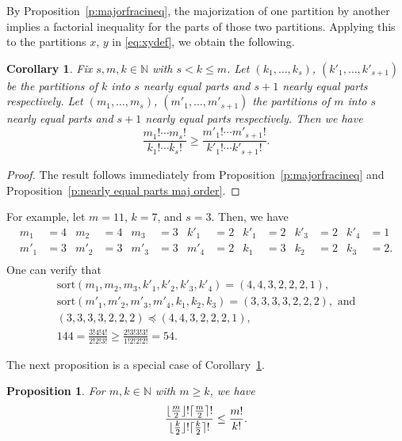 \documentclass[12pt]{amsart}
\DeclarePairedDelimiter\ceil{\lceil}{\rceil}
\DeclarePairedDelimiter\floor{\lfloor}{\rfloor}
\newtheorem{prop}[thm]{Proposition}
\newtheorem{cor}[thm]{Corollary}
\theoremstyle{definition}
\numberwithin{equation}{section}
\newcommand{\sort}{\mathrm{sort}}
\begin{document}
By Proposition~\ref{p:majorfracineq}, the majorization of one partition by another implies a factorial inequality for the parts of those two partitions.  Applying this to the partitions $x$, $y$ in \eqref{eq:xydef}, we obtain the following.

\begin{cor}\label{c:multi factorial inequality}
    Fix $s,m,k \in \mathbb{N}$ with $s < k\leq m$. Let $(k_1,\dotsc,k_{s})$, $(k'_1,\dotsc, k'_{s+1})$ be the partitions of $k$ into $s$ nearly equal parts and $s+1$ nearly equal parts respectively. Let $(m_1,\dotsc,m_{s})$, $(m'_1,\dotsc, m'_{s+1}) $ the partitions of $m$ into $s$ nearly equal parts and $s+1$ nearly equal parts respectively. Then we have \begin{equation}\label{eq:multi factorial inequality}
        \frac{m_1! \cdots m_{s}!}{k_1! \cdots k_{s}!} \geq \frac{m'_1! \cdots m'_{s+1}!}{k'_1! \cdots k'_{s+1}!}.
    \end{equation}
\end{cor}

\begin{proof}
    The result follows immediately from Proposition~\ref{p:majorfracineq} and Proposition~\ref{p:nearly equal parts maj order}.
\end{proof}

For example, let $m=11$, $k=7$, and $s=3$. Then, we have
\begin{align*}
    m_1&=4 & m_2 &=4 & m_3&=3 &k'_1&=2 & k'_1 &= 2 & k'_3&=2 & k'_4&=1 \\
    m'_1&=3 & m'_2 &=3 & m'_3&=3 & m'_4&=2 &k_1&=3 & k_2&=2 & k_3 &= 2 .\\
    \end{align*}
One can verify that \begin{gather*}
    \sort(m_1,m_2,m_3,k'_1,k'_2,k'_3,k'_4) = (4,4,3,2,2,2,1), \\
    \sort(m'_1,m'_2,m'_3,m'_4,k_1,k_2,k_3) = (3,3,3,3,2,2,2), \text{ and} \\
    (3,3,3,3,2,2,2)\preceq(4,4,3,2,2,2,1), \\
    144 = \frac{3!4!4!}{2!2!3!} \geq \frac{2!3!3!3!}{1!2!2!2!} = 54.
\end{gather*}

The next proposition is a special case of Corollary~\ref{c:multi factorial inequality}.

\begin{prop}\label{p:max factorial}
    For $m,k\in \mathbb N$ with $m \geq k$, we have
    \begin{equation*}
    \frac{\floor{\frac{m}{2}}!\ceil{\frac{m}{2}}!}{\floor{\frac{k}{2}}!\ceil{\frac{k}{2}}!} \leq \frac{m!}{k!}.
    \end{equation*}
\end{prop}
\end{document}
